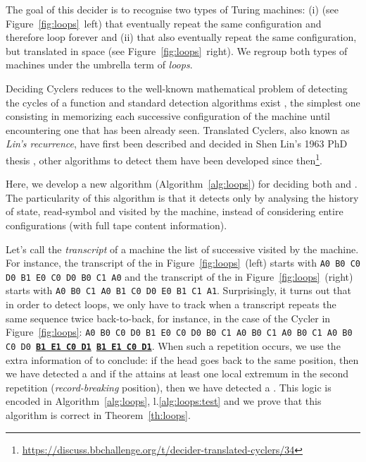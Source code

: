 
The goal of this decider is to recognise two types of Turing machines: (i) \textit{\cyclers} (see Figure~\ref{fig:loops}~left) that eventually repeat the same configuration and therefore loop forever and (ii) \textit{\TCs} that also eventually repeat the same configuration, but translated in space (see Figure~\ref{fig:loops}~right). We regroup both types of machines under the umbrella term of \textit{loops}.

Deciding Cyclers reduces to the well-known mathematical problem of detecting the cycles of a function and standard detection algorithms exist \cite{wiki:Cycle_detection}, the simplest one consisting in memorizing each successive configuration of the machine until encountering one that has been already seen. Translated Cyclers, also known as \textit{Lin's recurrence}, have first been described and decided in Shen Lin's 1963 PhD thesis \cite{Lin1963}, other algorithms to detect them have been developed since then\footnote{\url{https://discuss.bbchallenge.org/t/decider-translated-cyclers/34}}.

Here, we develop a new algorithm (Algorithm~\ref{alg:loops}) for deciding both \cyclers and \TCs. The particularity of this algorithm is that it detects \cyclers only by analysing the history of state, read-symbol and \headposs visited by the machine, instead of considering entire configurations (\ie with full tape content information).

Let's call the \textit{transcript} of a machine the list of successive \ssps visited by the machine. For instance, the transcript of the \cycler in Figure~\ref{fig:loops}~(left) starts with \texttt{A0 B0 C0 D0 B1 E0 C0 D0 B0 C1 A0} and the transcript of the \TC in Figure~\ref{fig:loops}~(right) starts with \texttt{A0 B0 C1 A0 B1 C0 D0 E0 B1 C1 A1}. Surprisingly, it turns out that in order to detect loops, we only have to track when a transcript repeats the same sequence twice back-to-back, for instance, in the case of the Cycler in Figure~\ref{fig:loops}: \texttt{A0 B0 C0 D0 B1 E0 C0 D0 B0 C1 A0 B0 C1 A0 B0 C1 A0 B0 C0 D0 \textbf{\underline{B1 E1 C0 D1}} \textbf{\underline{B1 E1 C0 D1}}}. When such a repetition occurs, we use the extra information of \headpos to conclude: if the head goes back to the same position, then we have detected a \cycler and if the \headpos attains at least one local extremum in the second repetition (\textit{record-breaking} position), then we have detected a \TC. This logic is encoded in Algorithm~\ref{alg:loops}, l.\ref{alg:loops:test} and we prove that this algorithm is correct in Theorem~\ref{th:loops}.

